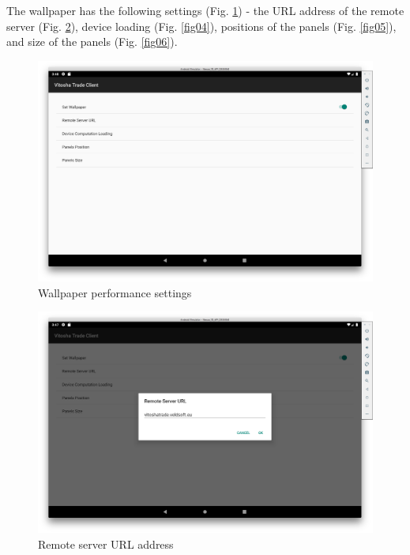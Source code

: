 \documentclass[a4paper,conference]{IEEEtran}
\begin{document}
The wallpaper has the following settings (Fig. \ref{fig02}) - the URL address of the remote server (Fig. \ref{fig03}), device loading (Fig. \ref{fig04}), positions of the panels (Fig. \ref{fig05}), and size of the panels (Fig. \ref{fig06}).

\begin{figure}[htbp]
\centerline{\includegraphics[width=1.0\linewidth]{fig02.png}}
\caption{Wallpaper performance settings}
\label{fig02}
\end{figure}

\begin{figure}[htbp]
\centerline{\includegraphics[width=1.0\linewidth]{fig03.png}}
\caption{Remote server URL address}
\label{fig03}
\end{figure}
\end{document}
